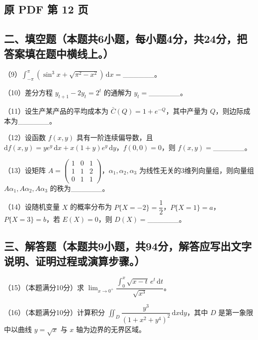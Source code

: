 \documentclass[UTF8,12pt]{ctexart}
\begin{document}
\clearpage

\subsection*{原 PDF 第 12 页}

\subsection*{二、填空题（本题共6小题，每小题4分，共24分，把答案填在题中横线上。）}

（9）\(\displaystyle \int_{-\pi}^{\pi}(\sin^3x+\sqrt{\pi^2-x^2})\,\mathrm dx=\)\_\_\_\_\_\_。


（10）差分方程 \(\displaystyle y_{t+1}-2y_t=2^t\) 的通解为 \(\displaystyle y_t=\)\_\_\_\_\_\_。


（11）设生产某产品的平均成本为 \(\displaystyle \bar C(Q)=1+e^{-Q}\)，其中产量为 \(\displaystyle Q\)，则边际成本为\_\_\_\_\_\_。


（12）设函数 \(\displaystyle f(x,\allowbreak y)\) 具有一阶连续偏导数，且 \(\displaystyle \mathrm df(x,\allowbreak y)=ye^y\,\mathrm dx+x(1+y)e^y\,\mathrm dy\)，\(\displaystyle f(0,\allowbreak 0)=0\)，则 \(\displaystyle f(x,\allowbreak y)=\)\_\_\_\_\_\_。


（13）设矩阵 \(\displaystyle A=\begin{pmatrix}1&0&1\\1&1&2\\0&1&1\end{pmatrix}\)，\(\displaystyle \alpha_1,\allowbreak \alpha_2,\allowbreak \alpha_3\) 为线性无关的3维列向量组，则向量组 \(\displaystyle A\alpha_1,\allowbreak A\alpha_2,\allowbreak A\alpha_3\) 的秩为\_\_\_\_\_\_。


（14）设随机变量 \(\displaystyle X\) 的概率分布为 \(\displaystyle P\{X=-2\}=\dfrac{\displaystyle 1}{\displaystyle 2}\)，\(\displaystyle P\{X=1\}=a\)，\(\displaystyle P\{X=3\}=b\)，若 \(\displaystyle E(X)=0\)，则 \(\displaystyle D(X)=\)\_\_\_\_\_\_。


\subsection*{三、解答题（本题共9小题，共94分，解答应写出文字说明、证明过程或演算步骤。）}

（15）（本题满分10分）求 \(\displaystyle \lim_{x\to0^+}\dfrac{\displaystyle \int_0^x\sqrt{x-t}\,e^t\,\mathrm dt}{\displaystyle \sqrt{x^3}}\)。


（16）（本题满分10分）计算积分 \(\displaystyle \iint_D\dfrac{\displaystyle y^3}{\displaystyle (1+x^2+y^4)^2}\,\mathrm dx\mathrm dy\)，其中 \(\displaystyle D\) 是第一象限中以曲线 \(\displaystyle y=\sqrt{x}\) 与 \(\displaystyle x\) 轴为边界的无界区域。
\end{document}

